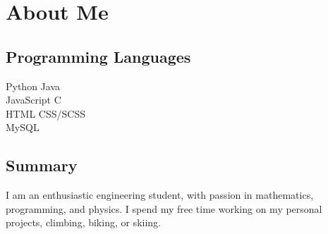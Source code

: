 \documentclass[]{deedy-resume-openfont}
\begin{document}
    \section{About Me}
    \begin{minipage}[t]{.35\textwidth}
    \subsection{Programming Languages}
    Python \textbullet{} Java \\
    JavaScript \textbullet{} C \\ 
    HTML \textbullet{} CSS/SCSS \\
    MySQL
    \sectionsep
    \end{minipage}
    \hfill
    \begin{minipage}[t]{.55\textwidth}
    \subsection{Summary}
    I am an enthusiastic engineering student, with passion in mathematics, programming, and physics. I spend my free time working on my personal projects, climbing, biking, or skiing.
    \end{minipage}
    
    
\end{document}
